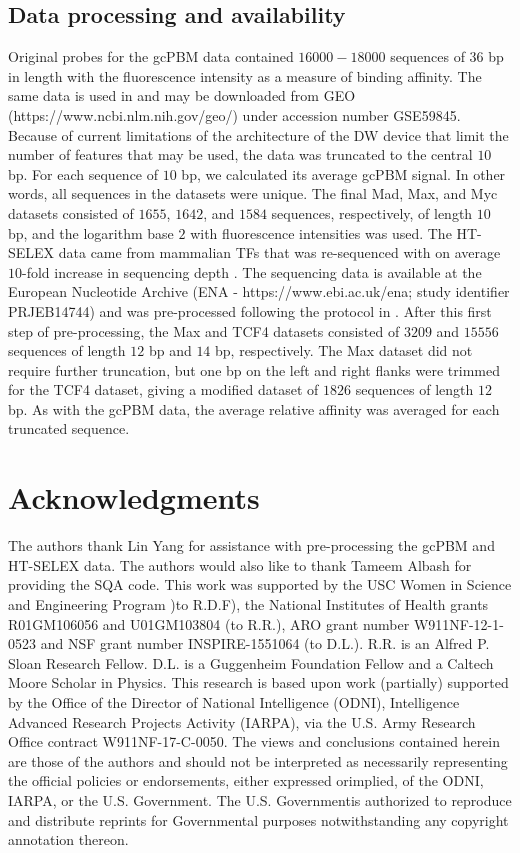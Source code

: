 \documentclass[aps,pra,groupedaddress,nofootinbib,notitlepage,showpacs,floatfix,superscriptaddress]{revtex4-1}
\begin{document}
\subsection*{Data processing and availability}
\label{sec:DataandPrecision}
Original probes for the gcPBM \cite{Gordan:13} data contained $16000-18000$ sequences of 36 bp in length with the fluorescence intensity as a measure of binding affinity. The same data is used in \cite{Zhou:15} and may be downloaded from GEO (https://www.ncbi.nlm.nih.gov/geo/) under accession number GSE59845. Because of current limitations of the architecture of the DW device that limit the number of features that may be used, the data was truncated to the central $10$ bp. For each sequence of $10$ bp, we calculated its average gcPBM signal. In other words, all sequences in the datasets were unique. The final Mad, Max, and Myc datasets consisted of $1655$, $1642$, and $1584$ sequences, respectively, of length $10$ bp, and the logarithm base $2$ with fluorescence intensities was used. The HT-SELEX data came from mammalian TFs \cite{Jolma:13} that was re-sequenced with on average $10$-fold increase in sequencing depth \cite{Yang:17}. The sequencing data is available at the European Nucleotide Archive (ENA - https://www.ebi.ac.uk/ena; study identifier PRJEB14744) and was pre-processed following the protocol in \cite{Yang:17}. After this first step of pre-processing, the Max and TCF4 datasets consisted of $3209$ and $15556$ sequences of length $12$ bp and $14$ bp, respectively. The Max dataset did not require further truncation, but one bp on the left and right flanks were trimmed for the TCF4 dataset, giving a modified dataset of $1826$ sequences of length $12$ bp. As with the gcPBM data, the average relative affinity was averaged for each truncated sequence. 

\section*{Acknowledgments} The authors thank Lin Yang for assistance with pre-processing the gcPBM and HT-SELEX data. The authors would also like to thank Tameem Albash for providing the SQA code. This work was supported by the USC Women in Science and Engineering Program )to R.D.F), the National Institutes of Health grants R01GM106056 and U01GM103804 (to R.R.), ARO grant number W911NF-12-1-0523 and NSF grant number INSPIRE-1551064 (to D.L.). R.R. is an Alfred P. Sloan Research Fellow. D.L. is a Guggenheim Foundation Fellow and a Caltech Moore Scholar in Physics. This research is based upon work (partially) supported by the Office of the Director of National Intelligence (ODNI), Intelligence Advanced Research Projects Activity (IARPA), via the U.S. Army Research Office contract W911NF-17-C-0050. The views and conclusions contained herein are those of the authors and should not be interpreted as necessarily representing the official policies or endorsements, either expressed orimplied, of the ODNI, IARPA, or the U.S. Government. The U.S. Governmentis authorized to reproduce and distribute reprints for Governmental purposes notwithstanding any copyright annotation thereon.
\end{document}
